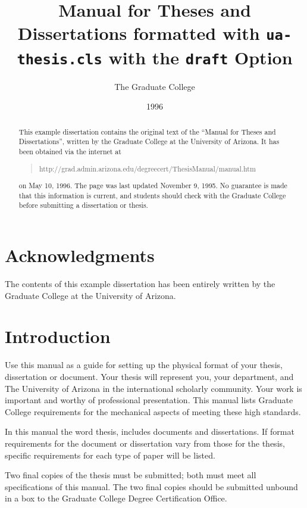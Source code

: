 \documentclass[draft]{ua-thesis}
\author{The Graduate College}
\title{Manual for Theses and Dissertations formatted with
       \texttt{ua-thesis.cls} with the \texttt{draft} Option}
\date{1996}
\begin{document}
\maketitle

\chapter*{Acknowledgments}

The contents of this example dissertation has been entirely written by the
Graduate College at the University of Arizona.

\tableofcontents
\listoffigures
\listoftables

\begin{abstract}
This example dissertation contains the original text of the ``Manual for
Theses and Dissertations'', written by the Graduate College at the
University of Arizona.  It has been obtained via the internet at
\begin{quote}
http://grad.admin.arizona.edu/degreecert/ThesisManual/manual.htm
\end{quote}
on May 10, 1996.  The page was last updated November 9, 1995. No guarantee
is made that this information is current, and students should check with
the Graduate College before submitting a dissertation or thesis.
\end{abstract}

\chapter{Introduction}

Use this manual as a guide for setting up the physical format of your
thesis, dissertation or document. Your thesis will represent you, your
department, and The University of Arizona in the international scholarly
community. Your work is important and worthy of professional presentation.
This manual lists Graduate College requirements for the mechanical aspects
of meeting these high standards.

In this manual the word thesis, includes documents and dissertations. If
format requirements for the document or dissertation vary from those for the
thesis, specific requirements for each type of paper will be listed.

Two final copies of the thesis must be submitted; both must meet all
specifications of this manual. The two final copies should be submitted
unbound in a box to the Graduate College Degree Certification Office.
\end{document}
